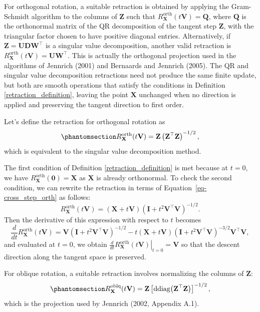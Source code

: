 \documentclass[
  12pt,
  letterpaper,
  article]{scrartcl}
\begin{document}
For orthogonal rotation, a suitable retraction is obtained by applying
the Gram-Schmidt algorithm to the columns of \(\mathbf{Z}\) such that
\(R_\mathbf{X}^{\text{orth}}(t\mathbf{V}) = \mathbf{Q}\), where
\(\mathbf{Q}\) is the orthonormal matrix of the QR decomposition of the
tangent step \(\mathbf{Z}\), with the triangular factor chosen to have
positive diagonal entries. Alternatively, if
\(\mathbf{Z}=\mathbf{U}\mathbf{D}\mathbf{W}^\top\) is a singular value
decomposition, another valid retraction is
\(R_\mathbf{X}^{\text{orth}}(t\mathbf{V}) = \mathbf{U}\mathbf{W}^\top\).
This is actually the orthogonal projection used in the algorithms of
Jennrich (2001) and Bernaards and Jennrich (2005). The QR and singular
value decomposition retractions need not produce the same finite update,
but both are smooth operations that satisfy the conditions in Definition
\ref{retraction_definition}, leaving the point \(\mathbf{X}\) unchanged
when no direction is applied and preserving the tangent direction to
first order.

Let's define the retraction for orthogonal rotation as
\begin{equation}\protect\phantomsection\label{eq-orth_retraction}{
R_{\mathbf{X}}^{\mathrm{orth}}(t\mathbf{V}) = \mathbf{Z} \left(\mathbf{Z}^\top \mathbf{Z}\right)^{-1/2},
}\end{equation} which is equivalent to the singular value decomposition
method.

The first condition of Definition \ref{retraction_definition} is met
because at \(t=0\), we have
\(R_{\mathbf{X}}^{\mathrm{orth}}(\mathbf{0}) = \mathbf{X}\) as
\(\mathbf{X}\) is already orthonormal. To check the second condition, we
can rewrite the retraction in terms of Equation~\ref{eq-cross_step_orth}
as follows: \[
R_{\mathbf{X}}^{\mathrm{orth}}(t\mathbf{V}) = (\mathbf{X}+t\mathbf{V})\left(\mathbf{I}+t^2\mathbf{V}^\top \mathbf{V}\right)^{-1/2}.
\] Then the derivative of this expression with respect to \(t\) becomes
\[
\frac{d}{dt}R_{\mathbf{X}}^{\mathrm{orth}}(t\mathbf{V}) = \mathbf{V}\left(\mathbf{I}+t^2\mathbf{V}^\top \mathbf{V}\right)^{-1/2}-t(\mathbf{X}+t\mathbf{V})\left(\mathbf{I}+t^2\mathbf{V}^\top \mathbf{V}\right)^{-3/2}\mathbf{V}^\top \mathbf{V},
\] and evaluated at \(t=0\), we obtain
\(\left.\frac{d}{dt}R_{\mathbf{X}}^{\mathrm{orth}}(t\mathbf{V})\right|_{t=0} = \mathbf{V}\)
so that the descent direction along the tangent space is preserved.

For oblique rotation, a suitable retraction involves normalizing the
columns of \(\mathbf{Z}\):
\begin{equation}\protect\phantomsection\label{eq-oblq_retraction}{
R_{\mathbf{X}}^{\mathrm{oblq}}(t\mathbf{V}) = \mathbf{Z} \left[\mathrm{ddiag}\!\left(\mathbf{Z}^\top \mathbf{Z}\right)\right]^{-1/2},
}\end{equation} which is the projection used by Jennrich (2002, Appendix
A.1).
\end{document}
